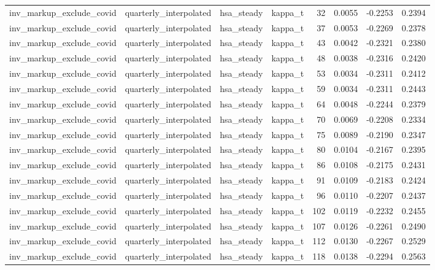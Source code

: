 \begin{tabular}{llllrrrr}
inv\_markup\_exclude\_covid & quarterly\_interpolated & hsa\_steady & kappa\_t & 32 & 0.0055 & -0.2253 & 0.2394 \\
inv\_markup\_exclude\_covid & quarterly\_interpolated & hsa\_steady & kappa\_t & 37 & 0.0053 & -0.2269 & 0.2378 \\
inv\_markup\_exclude\_covid & quarterly\_interpolated & hsa\_steady & kappa\_t & 43 & 0.0042 & -0.2321 & 0.2380 \\
inv\_markup\_exclude\_covid & quarterly\_interpolated & hsa\_steady & kappa\_t & 48 & 0.0038 & -0.2316 & 0.2420 \\
inv\_markup\_exclude\_covid & quarterly\_interpolated & hsa\_steady & kappa\_t & 53 & 0.0034 & -0.2311 & 0.2412 \\
inv\_markup\_exclude\_covid & quarterly\_interpolated & hsa\_steady & kappa\_t & 59 & 0.0034 & -0.2311 & 0.2443 \\
inv\_markup\_exclude\_covid & quarterly\_interpolated & hsa\_steady & kappa\_t & 64 & 0.0048 & -0.2244 & 0.2379 \\
inv\_markup\_exclude\_covid & quarterly\_interpolated & hsa\_steady & kappa\_t & 70 & 0.0069 & -0.2208 & 0.2334 \\
inv\_markup\_exclude\_covid & quarterly\_interpolated & hsa\_steady & kappa\_t & 75 & 0.0089 & -0.2190 & 0.2347 \\
inv\_markup\_exclude\_covid & quarterly\_interpolated & hsa\_steady & kappa\_t & 80 & 0.0104 & -0.2167 & 0.2395 \\
inv\_markup\_exclude\_covid & quarterly\_interpolated & hsa\_steady & kappa\_t & 86 & 0.0108 & -0.2175 & 0.2431 \\
inv\_markup\_exclude\_covid & quarterly\_interpolated & hsa\_steady & kappa\_t & 91 & 0.0109 & -0.2183 & 0.2424 \\
inv\_markup\_exclude\_covid & quarterly\_interpolated & hsa\_steady & kappa\_t & 96 & 0.0110 & -0.2207 & 0.2437 \\
inv\_markup\_exclude\_covid & quarterly\_interpolated & hsa\_steady & kappa\_t & 102 & 0.0119 & -0.2232 & 0.2455 \\
inv\_markup\_exclude\_covid & quarterly\_interpolated & hsa\_steady & kappa\_t & 107 & 0.0126 & -0.2261 & 0.2490 \\
inv\_markup\_exclude\_covid & quarterly\_interpolated & hsa\_steady & kappa\_t & 112 & 0.0130 & -0.2267 & 0.2529 \\
inv\_markup\_exclude\_covid & quarterly\_interpolated & hsa\_steady & kappa\_t & 118 & 0.0138 & -0.2294 & 0.2563 \\

\end{tabular}
